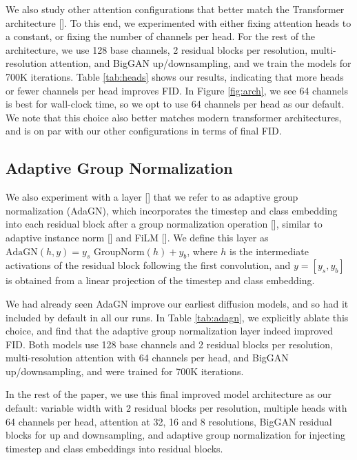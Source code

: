 We also study other attention configurations that better match the Transformer architecture []. To this end, we experimented with either fixing attention heads to a constant, or fixing the number of channels per head. For the rest of the architecture, we use 128 base channels, 2 residual blocks per resolution, multi-resolution attention, and BigGAN up/downsampling, and we train the models for 700K iterations. Table \ref{tab:heads} shows our results, indicating that more heads or fewer channels per head improves FID. In Figure \ref{fig:arch}, we see 64 channels is best for wall-clock time, so we opt to use 64 channels per head as our default. We note that this choice also better matches modern transformer architectures, and is on par with our other configurations in terms of final FID.

\subsection{Adaptive Group Normalization}
\label{sec:adapgn}

We also experiment with a layer [] that we refer to as adaptive group normalization (AdaGN), which incorporates the timestep and class embedding into each residual block after a group normalization operation [], similar to adaptive instance norm [] and FiLM []. We define this layer as $\text{AdaGN}(h, y) = y_s  \text{ GroupNorm}(h) + y_b$, where $h$ is the intermediate activations of the residual block following the first convolution, and $y = [y_s, y_b]$ is obtained from a linear projection of the timestep and class embedding. 

We had already seen AdaGN improve our earliest diffusion models, and so had it included by default in all our runs. In Table \ref{tab:adagn}, we explicitly ablate this choice, and find that the adaptive group normalization layer indeed improved FID. Both models use 128 base channels and 2 residual blocks per resolution, multi-resolution attention with 64 channels per head, and BigGAN up/downsampling, and were trained for 700K iterations.

In the rest of the paper, we use this final improved model architecture as our default: variable width with 2 residual blocks per resolution, multiple heads with 64 channels per head, attention at 32, 16 and 8 resolutions, BigGAN residual blocks for up and downsampling, and adaptive group normalization for injecting timestep and class embeddings into residual blocks.

